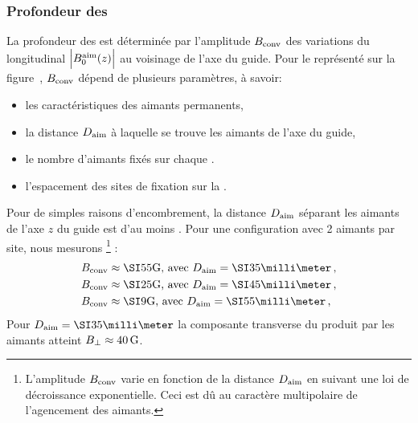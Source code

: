 \subsubsection{Profondeur des \pqps}
La profondeur des \pqps est déterminée par l'amplitude ${B_{\rm conv}}$ %
%
des variations du \chm longitudinal $\Module{\ConvBparaAim(z)}$ au voisinage de l'axe du guide. Pour le \setup représenté sur la figure~, ${B_{\rm conv}}$ dépend de plusieurs paramètres, à savoir:
\begin{itemize}
	\item les caractéristiques des aimants permanents,
	\item la distance ${D_{\rm aim}}$ à laquelle se trouve les aimants de l'axe du guide,
	\item le nombre d'aimants fixés sur chaque \scc.
	\item l'espacement des sites de fixation sur la \couconv.
\end{itemize}
%

\pagebreak

Pour de simples raisons d'encombrement, la distance ${D_{\rm aim}}$ séparant les aimants de l'axe $z$ du guide est d'au moins . Pour une configuration avec 2 aimants par site, nous mesurons%
\footnote{L'amplitude ${B_{\rm conv}}$ varie en fonction de la distance ${D_{\rm aim}}$ en suivant une loi de décroissance exponentielle. Ceci est dû au caractère multipolaire de l'agencement des aimants.}
%
 :
\begin{align}
\ConvBamplit &\approx \gauss{55} \mbox{, avec }\ConvDaimant=\mm{35}\virguleformule \nonumber \\
\ConvBamplit &\approx \gauss{25} \mbox{, avec }\ConvDaimant=\mm{45}\virguleformule \nonumber \\
\ConvBamplit &\approx \gauss{9} \mbox{, avec }\ConvDaimant=\mm{55} \nonumber
\virguleformule
\end{align}
Pour $\ConvDaimant=\mm{35}$ la composante transverse du \chm produit par les aimants atteint ${B_{\rm \bot}} \approx \SI{40}{{\rm G}}$.

